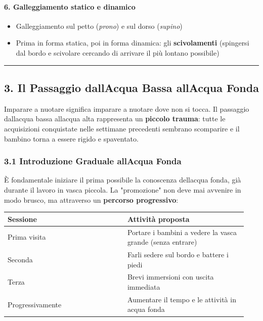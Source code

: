 \documentclass[a4paper,11pt]{article}
\providecommand{\tightlist}{%
  \setlength{\itemsep}{0pt}\setlength{\parskip}{0pt}}
\begin{document}
\paragraph{6. Galleggiamento statico e
      dinamico}\label{galleggiamento-statico-e-dinamico}

\begin{itemize}
      \tightlist
      \item
            Galleggiamento sul petto (\emph{prono}) e sul dorso (\emph{supino})
      \item
            Prima in forma statica, poi in forma dinamica: gli
            \textbf{scivolamenti} (spingersi dal bordo e scivolare cercando di
            arrivare il più lontano possibile)
\end{itemize}

\begin{center}\rule{0.5\linewidth}{0.5pt}\end{center}

\subsection{3. Il Passaggio dall\textquotesingle Acqua Bassa
      all\textquotesingle Acqua
      Fonda}\label{il-passaggio-dallacqua-bassa-allacqua-fonda}

Imparare a nuotare significa imparare a nuotare dove non si tocca. Il
passaggio dall\textquotesingle acqua bassa all\textquotesingle acqua
alta rappresenta un \textbf{piccolo trauma}: tutte le acquisizioni
conquistate nelle settimane precedenti sembrano scomparire e il bambino
torna a essere rigido e spaventato.

\subsubsection{3.1 Introduzione Graduale all\textquotesingle Acqua
      Fonda}\label{introduzione-graduale-allacqua-fonda}

È fondamentale iniziare il prima possibile la conoscenza
dell\textquotesingle acqua fonda, già durante il lavoro in vasca
piccola. La "promozione" non deve mai avvenire in modo brusco, ma
attraverso un \textbf{percorso progressivo}:

\begin{longtable}[]{@{}p{0.47\linewidth}p{0.47\linewidth}@{}}
      \toprule\noalign{}
      Sessione         & Attività proposta                                 \\
      \midrule\noalign{}
      \endhead
      \bottomrule\noalign{}
      \endlastfoot
      Prima visita     & Portare i bambini a vedere la vasca grande (senza
      entrare)                                                             \\
      Seconda          & Farli sedere sul bordo e battere i piedi          \\
      Terza            & Brevi immersioni con uscita immediata             \\
      Progressivamente & Aumentare il tempo e le attività in acqua fonda   \\
\end{longtable}
\end{document}
